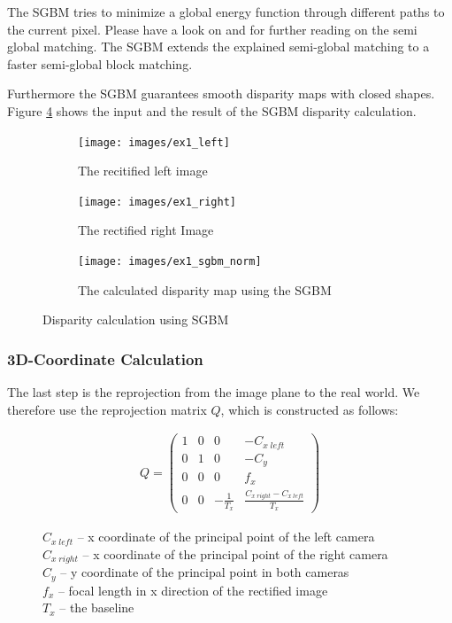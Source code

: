 \documentclass[11pt]{article}
\begin{document}
The SGBM tries to minimize a global energy function through different paths to the current pixel. Please have a look on \cite{hirschmuller2005accurate} and \cite{hirschmuller2008stereo} for further reading on the semi global matching. The SGBM extends the explained semi-global matching to a faster semi-global block matching.

Furthermore the SGBM guarantees smooth disparity maps with closed shapes. Figure \ref{fig:ex1_sgbm} shows the input and the result of the SGBM disparity calculation.

\begin{figure}[H]
        \centering
        \begin{subfigure}[b]{0.45\textwidth}
                \texttt{[image: images/ex1\_left]}
                \caption{The recitified left image}
                \label{fig:ex1_left}
        \end{subfigure}\hfill  
        \begin{subfigure}[b]{0.45\textwidth}
                \texttt{[image: images/ex1\_right]}
                \caption{The rectified right Image}
                \label{fig:ex1_right}
        \end{subfigure}

        \begin{subfigure}[b]{\textwidth}
                \texttt{[image: images/ex1\_sgbm\_norm]}
                \caption{The calculated disparity map using the SGBM}
                \label{fig:ex1_sgbm_norm}
        \end{subfigure}
        \caption{Disparity calculation using SGBM}\label{fig:ex1_sgbm}
\end{figure}

\subsubsection{3D-Coordinate Calculation}
The last step is the reprojection from the image plane to the real world. We therefore use the reprojection matrix $Q$, which is constructed as follows:

\begin{figure}[H]
\centering
\begin{align*}
Q=
\begin{pmatrix}
1 & 0 & 0 & -C_{x\;left} \\
0 & 1 & 0 & -C_{y} \\
0 & 0 & 0 & f_x \\
0 & 0 & -\frac{1}{T_x} & \frac{C_{x\;right}-C_{x\;left}}{T_x}
\end{pmatrix}
\end{align*}
\captionsetup{justification=justified,margin=1cm}
\caption*{
 $C_{x\;left}$ -- x coordinate of the principal point of the left camera\\
 $C_{x\;right}$ -- x coordinate of the principal point of the right camera\\
 $C_{y}$ -- y coordinate of the principal point in both cameras\\
 $f_x$ -- focal length in x direction of the rectified image\\
 $T_x$ -- the baseline}
\end{figure}
\end{document}
